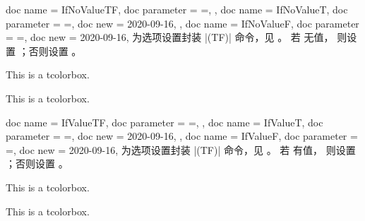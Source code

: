 \clearpage

\begin{docTcbKeys}[doc description = {无默认值}]
  {
    {
      doc name        = IfNoValueTF,
      doc parameter   = {=},
    },
    {
      doc name        = IfNoValueT,
      doc parameter   = {=},
      doc new         = 2020-09-16,
    },
    {
      doc name        = IfNoValueF,
      doc parameter   = {=},
      doc new         = 2020-09-16,
    }
  }
  为选项设置封装 |\IfNoValue(TF)| 命令，见 \cite{latexproject:usrguide}。
  若  无值，
  则设置 ；否则设置 。
\begin{dispExample}

\begin{mybox}
This is a tcolorbox.
\end{mybox}

\begin{mybox}
This is a tcolorbox.
\end{mybox}
\end{dispExample}
\end{docTcbKeys}

\medskip

\begin{docTcbKeys}[doc description = {无默认值}]
  {
    {
      doc name        = IfValueTF,
      doc parameter   = {=},
    },
    {
      doc name        = IfValueT,
      doc parameter   = {=},
      doc new         = 2020-09-16,
    },
    {
      doc name        = IfValueF,
      doc parameter   = {=},
      doc new         = 2020-09-16,
    }
  }
  为选项设置封装 |\IfValue(TF)| 命令，见 \cite{latexproject:usrguide}。
  若  有值，
  则设置 ；否则设置 。
\begin{dispExample}

\begin{mybox}
This is a tcolorbox.
\end{mybox}

\begin{mybox}[My title]
This is a tcolorbox.
\end{mybox}
\end{dispExample}
\end{docTcbKeys}


